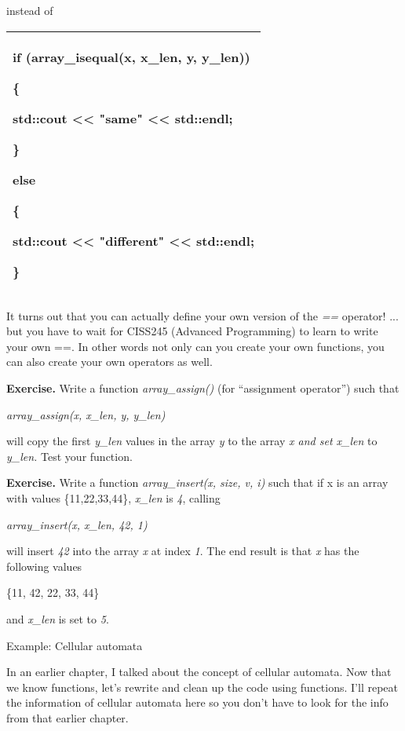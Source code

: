 \documentclass[
]{article}
\begin{document}
instead of

\begin{longtable}[]{@{}l@{}}
\toprule
\endhead
\begin{minipage}[t]{0.97\columnwidth}\raggedright
if (array\_isequal(x, x\_len, y, y\_len))

\{

std::cout \textless\textless{} "same" \textless\textless{} std::endl;

\}

else

\{

std::cout \textless\textless{} "different" \textless\textless{}
std::endl;

\}\strut
\end{minipage}\tabularnewline
\bottomrule
\end{longtable}

It turns out that you can actually define your own version of the
\emph{==} operator! ... but you have to wait for CISS245 (Advanced
Programming) to learn to write your own ==. In other words not only can
you create your own functions, you can also create your own operators as
well.

\textbf{Exercise.} Write a function \emph{array\_assign()} (for
``assignment operator'') such that

\emph{array\_assign(x, x\_len, y, y\_len)}

will copy the first \emph{y\_len} values in the array \emph{y} to the
array \emph{x and set x\_len} to \emph{y\_len.} Test your function.

\textbf{Exercise.} Write a function \emph{array\_insert(x, size, v, i)}
such that if x is an array with values \{11,22,33,44\}, \emph{x\_len} is
\emph{4}, calling

\emph{array\_insert(x, x\_len, 42, 1)}

will insert \emph{42} into the array \emph{x} at index \emph{1}. The end
result is that \emph{x} has the following values

\{11, 42, 22, 33, 44\}

and \emph{x\_len} is set to \emph{5}.

Example: Cellular automata

In an earlier chapter, I talked about the concept of cellular automata.
Now that we know functions, let's rewrite and clean up the code using
functions. I'll repeat the information of cellular automata here so you
don't have to look for the info from that earlier chapter.
\end{document}

